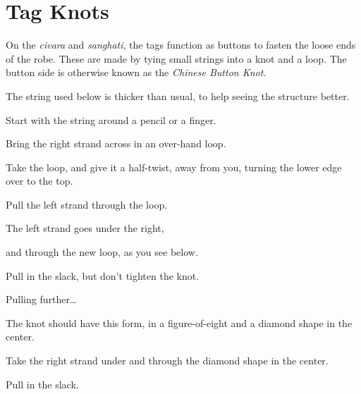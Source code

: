 \chapter{Tag Knots}

On the \emph{civara} and \emph{sanghati}, the tags function as buttons
to fasten the loose ends of the robe. These are made by tying small
strings into a knot and a loop. The button side is otherwise known as
the \emph{Chinese Button Knot}.

The string used below is thicker than usual, to help seeing the
structure better.

Start with the string around a pencil or a finger.


Bring the right strand across in an over-hand loop.


\clearpage

Take the loop, and give it a half-twist, away from you, turning the
lower edge over to the top.


Pull the left strand through the loop.


The left strand goes under the right,


\clearpage

and through the new loop, as you see below.


Pull in the slack, but don't tighten the knot.


Pulling further\ldots{}


\clearpage

The knot should have this form, in a figure-of-eight and a diamond shape
in the center.


Take the right strand under and through the diamond shape in the center.


Pull in the slack.

